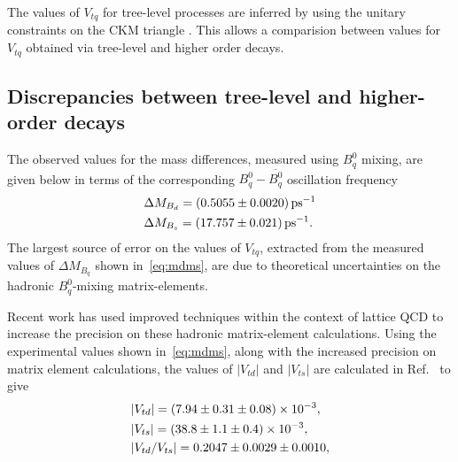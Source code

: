 The values of $V_{tq}$ for tree-level processes are inferred by using the unitary constraints
on the CKM triangle \cite{ckm}. This allows a comparision between values for $V_{tq}$ obtained via tree-level and higher order decays.%
\subsection{Discrepancies between tree-level and higher-order decays}
\label{subsubsec:loop}
The observed values for the mass differences, measured using $B^{0}_{q}$ mixing, are given below in terms of the corresponding $B^{0}_{q} - \overline{B^{0}_{q}}$ oscillation frequency\cite{pdg} \cite{LHCb-PAPER-2013-006}
\begin{equation}
  \begin{split}
    &
  \Delta M_{B_{d}} = (0.5055\pm0.0020){\rm \,ps}^{-1} \\&
  \Delta M_{{B}_{s}} = (17.757 \pm 0.021){\rm \,ps}^{-1}.\\
  \end{split}
\label{eq:mdms}
\end{equation}
The largest source of error on the values of $V_{tq}$, extracted from the measured values of $\Delta M_{B_{q}}$ shown in~\autoref{eq:mdms}, are due to theoretical uncertainties on the hadronic $B^{0}_{q}$-mixing matrix-elements.

Recent work \cite{vtdvts} has used improved
techniques within the context of lattice QCD to increase the
precision on these hadronic matrix-element calculations. Using the
experimental values shown in~\autoref{eq:mdms}, along with the
increased precision on matrix element calculations, the values of
$|V_{td}|$ and $|V_{ts}|$ are calculated in Ref.~\cite{vtdvts} to give
\begin{equation}
  \begin{split}
 & |{V_{{t}{d}}}| = (7.94 \pm 0.31 \pm 0.08)\times 10^{-3},\\
& |{V_{{t}{s}}}| = (38.8\pm 1.1 \pm 0.4)\times 10^{-3},\\
& |{V_{{t}{d}}}/{V_{{t}{s}}}| = 0.2047\pm 0.0029 \pm 0.0010,
  \end{split}
\end{equation}

